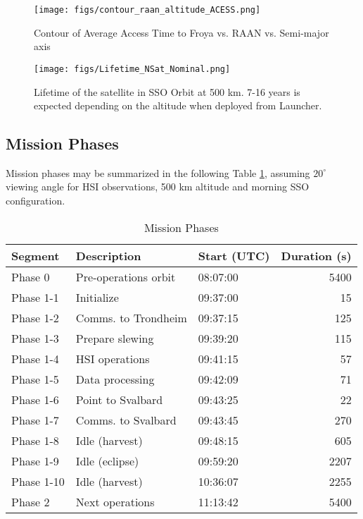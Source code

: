 \begin{figure}[htbp]
  \centering
    \texttt{[image: figs/contour\_raan\_altitude\_ACESS.png]}
    \caption{Contour of Average Access Time to Froya vs. RAAN vs. Semi-major axis}
    \label{fig:acc_raan_altitude2}
\end{figure}
\begin{figure}[htbp]
	\centering
	\texttt{[image: figs/Lifetime\_NSat\_Nominal.png]}
	\caption{Lifetime of the satellite in SSO Orbit at 500 km. 7-16 years is expected depending on the altitude when deployed from Launcher.}
	\label{fig:lifetime}
\end{figure}
\subsection{Mission Phases}
Mission phases may be summarized in the following Table \ref{tab:mission_phases1}, assuming $20^{\circ}$ viewing angle for HSI observations, 500 km altitude and morning SSO configuration.
\begin{table}[htbp]
	\caption{Mission Phases}
	\label{tab:mission_phases1}
	\centering
		\begin{tabular}{|l|l|l|r|}
			\hline
			Segment &		Description		& Start (UTC)	& Duration (s) \\
			\hline
			Phase 0 & Pre-operations orbit & 08:07:00 & 5400 \\
			Phase 1-1 &	Initialize &	09:37:00 &	15 \\
			Phase 1-2	& Comms. to Trondheim	& 09:37:15 &	125 \\
			Phase 1-3	& Prepare slewing	& 09:39:20	& 115 \\
			Phase 1-4	& HSI operations	& 09:41:15 &	57 \\
			Phase 1-5	& Data processing	& 09:42:09 &	71 \\
			Phase 1-6	& Point to Svalbard &	09:43:25	& 22 \\
			Phase 1-7	& Comms. to Svalbard	& 09:43:45 & 270 \\
			Phase 1-8	& Idle (harvest) & 09:48:15 &	605 \\
			Phase 1-9	& Idle (eclipse)	& 09:59:20 &	2207 \\
			Phase 1-10 & Idle (harvest) &	10:36:07	& 2255 \\
			Phase 2 &	Next operations	& 11:13:42	& 5400 \\
			\hline
			\end{tabular}
\end{table}

